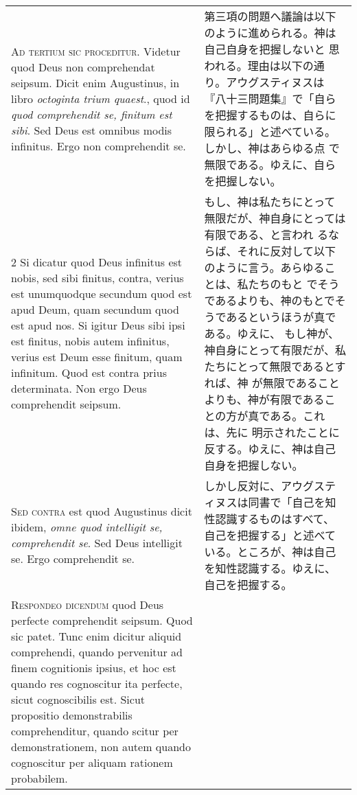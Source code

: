 \documentclass[10pt]{jsarticle} %
\begin{document}
\begin{longtable}{p{21em}p{21em}}
{\huge A}{\scshape d tertium sic proceditur}. Videtur quod Deus non
comprehendat seipsum. Dicit enim Augustinus, in libro {\itshape
octoginta trium quaest}., quod id {\itshape quod comprehendit se,
finitum est sibi}. Sed Deus est omnibus modis infinitus. Ergo non
comprehendit se.

&

第三項の問題へ議論は以下のように進められる。神は自己自身を把握しないと
思われる。理由は以下の通り。アウグスティヌスは『八十三問題集』で「自ら
を把握するものは、自らに限られる」と述べている。しかし、神はあらゆる点
で無限である。ゆえに、自らを把握しない。

\\


2 Si dicatur quod Deus infinitus est nobis,
sed sibi finitus, contra, verius est unumquodque secundum quod est apud
Deum, quam secundum quod est apud nos. Si igitur Deus sibi ipsi est
finitus, nobis autem infinitus, verius est Deum esse finitum, quam
infinitum. Quod est contra prius determinata. Non ergo Deus comprehendit
seipsum.


&

もし、神は私たちにとって無限だが、神自身にとっては有限である、と言われ
るならば、それに反対して以下のように言う。あらゆることは、私たちのもと
でそうであるよりも、神のもとでそうであるというほうが真である。ゆえに、
もし神が、神自身にとって有限だが、私たちにとって無限であるとすれば、神
が無限であることよりも、神が有限であることの方が真である。これは、先に
明示されたことに反する。ゆえに、神は自己自身を把握しない。


\\


{\scshape Sed contra} est quod Augustinus dicit ibidem, {\itshape omne
quod intelligit se, comprehendit se}. Sed Deus intelligit se. Ergo
comprehendit se.

&

しかし反対に、アウグスティヌスは同書で「自己を知性認識するものはすべて、
自己を把握する」と述べている。ところが、神は自己を知性認識する。ゆえに、
自己を把握する。


\\


{\scshape Respondeo dicendum} quod Deus perfecte comprehendit
seipsum. Quod sic patet. Tunc enim dicitur aliquid comprehendi, quando
pervenitur ad finem cognitionis ipsius, et hoc est quando res
cognoscitur ita perfecte, sicut cognoscibilis est. Sicut propositio
demonstrabilis comprehenditur, quando scitur per demonstrationem, non
autem quando cognoscitur per aliquam rationem probabilem. 


\end{longtable}
\end{document}
